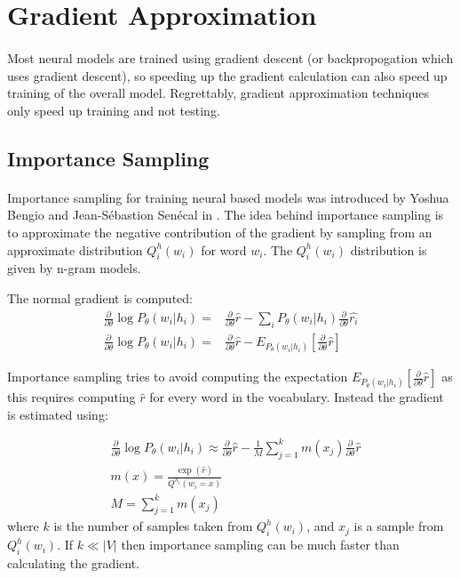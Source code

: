 \section{Gradient Approximation}
\paragraph{}
Most neural models are trained using gradient descent (or backpropogation which uses gradient descent), so speeding up the gradient calculation can also speed up training of the overall model. Regrettably, gradient approximation techniques only speed up training and not testing. 

\subsection{Importance Sampling}
\paragraph{}
Importance sampling for training neural based models was introduced by Yoshua Bengio and Jean-S\'{e}bastion Sen\'{e}cal in \cite{BengioSenecal2003}.
The idea behind importance sampling is to approximate the negative contribution of the gradient by sampling from an approximate distribution $Q^h_i(w_i)$ for word $w_i$. The $Q^h_i(w_i)$ distribution is given by n-gram models. 

The normal gradient is computed:
\begin{align}
\frac{\partial}{\partial \theta} \log P_{\theta}(w_i| h_i) =& \frac{\partial}{\partial \theta} \hat{r} - \sum_i P_{\theta}(w_i| h_i) \frac{\partial}{\partial \theta} \hat{r_i} 
\\ \frac{\partial}{\partial \theta} \log P_{\theta}(w_i| h_i) =& \frac{\partial}{\partial \theta} \hat{r} - E_{P_{\theta}(w_i| h_i)} \left[ \frac{\partial}{\partial \theta} \hat{r} \right] \nonumber
\end{align}

Importance sampling tries to avoid computing the expectation $E_{P_{\theta}(w_i| h_i)} \left[ \frac{\partial}{\partial \theta} \hat{r} \right]$ as this requires computing $\hat{r}$ for every word in the vocabulary. Instead the gradient is estimated using:

\begin{align}
&\frac{\partial}{\partial \theta} \log P_{\theta}(w_i| h_i) \approx  \frac{\partial}{\partial \theta} \hat{r} - \frac{1}{M} \sum_{j=1}^k m(x_j) \frac{\partial}{\partial \theta} \hat{r}
\\ &m(x) =  \frac{\exp(\hat{r})}{Q^{h_i}(w_i=x)} \nonumber
\\ &M= \sum_{j=1}^k m(x_j) \nonumber
\end{align}
where $k$ is the number of samples taken from $Q^h_i(w_i)$, and $x_j$ is a sample from  $Q^h_i(w_i)$. If $k \ll |V|$ then importance sampling can be much faster than calculating the gradient.

